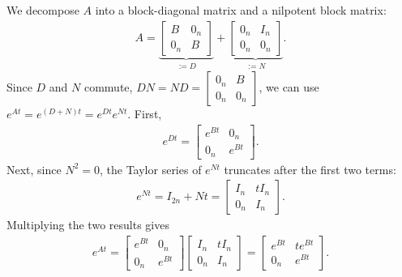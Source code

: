 \documentclass[a4paper, 11pt]{article}
\begin{document}
\begin{solution}
We decompose $A$ into a block-diagonal matrix and a nilpotent block matrix:
\begin{align*}
    A = \underbrace{\begin{bmatrix} B & 0_n\\ 0_n & B \end{bmatrix}}_{:=D} + \underbrace{\begin{bmatrix} 0_n & I_n\\ 0_n & 0_n \end{bmatrix}}_{:=N}.
\end{align*}
Since $D$ and $N$ commute, $DN=ND=\begin{bmatrix} 0_n & B\\ 0_n & 0_n \end{bmatrix}$, we can use $e^{At}=e^{(D+N)t}=e^{Dt}e^{Nt}$. First,
\begin{align*}
    e^{Dt} = \begin{bmatrix} e^{Bt} & 0_n\\ 0_n & e^{Bt} \end{bmatrix}.
\end{align*}
Next, since $N^2=0$, the Taylor series of $e^{Nt}$ truncates after the first two terms:
\begin{align*}
    e^{Nt} = I_{2n}+Nt = \begin{bmatrix} I_n & tI_n\\ 0_n & I_n \end{bmatrix}.
\end{align*}
Multiplying the two results gives
\begin{align*}
    e^{At} = \begin{bmatrix} e^{Bt} & 0_n\\ 0_n & e^{Bt} \end{bmatrix}\begin{bmatrix} I_n & tI_n\\ 0_n & I_n \end{bmatrix} = \begin{bmatrix} e^{Bt} & te^{Bt}\\ 0_n & e^{Bt} \end{bmatrix}.
\end{align*}


\end{solution}
\end{document}
